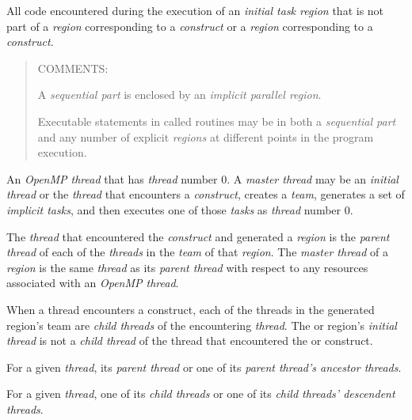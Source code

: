 \glossarydefstart
All code encountered during the execution of an \emph{initial task region} 
that is not part of a  \emph{region} corresponding to a 
 \emph{construct} or a 
\emph{region} corresponding to a  \emph{construct}.

\begin{quote}
COMMENTS:

A \emph{sequential part} is enclosed by an \emph{implicit parallel region}.

Executable statements in called routines may be in both a \emph{sequential
part} and any number of explicit  \emph{regions} at different 
points in the program execution.
\end{quote}
\glossarydefend

\glossarydefstart
An \emph{OpenMP thread} that has  \emph{thread} number 0. A \emph{master
thread} may be an \emph{initial thread} or the \emph{thread} that encounters a
 \emph{construct}, creates a \emph{team}, generates a set of
\emph{implicit tasks}, and then executes one of those \emph{tasks} as
\emph{thread} number 0.
\glossarydefend

\glossarydefstart
The \emph{thread} that encountered the  \emph{construct} 
and generated a  \emph{region} is the \emph{parent thread} 
of each of the \emph{threads} in the \emph{team} of that
 \emph{region}. The \emph{master thread}
of a  \emph{region} is the same \emph{thread}
as its \emph{parent thread} with respect to any resources associated with 
an \emph{OpenMP thread}.
\glossarydefend

\glossarydefstart
When a thread encounters a  construct, each of the threads 
in the generated  region's team are \emph{child threads} of 
the encountering \emph{thread}. The  or  region's 
\emph{initial thread} is not a \emph{child thread} of the thread
that encountered the  or  construct.
\glossarydefend

\glossarydefstart
For a given \emph{thread}, its \emph{parent thread} or one of its 
\emph{parent thread's ancestor threads}.
\glossarydefend

\glossarydefstart
For a given \emph{thread}, one of its \emph{child threads} or one of
its \emph{child threads' descendent threads}.
\glossarydefend


